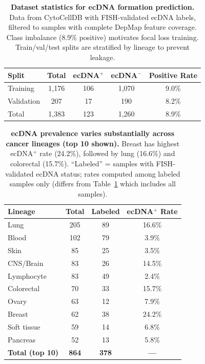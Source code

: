 \documentclass[sigconf,anonymous]{acmart}
\begin{document}
\begin{table}[h]
\caption{\textbf{Dataset statistics for ecDNA formation prediction.} Data from CytoCellDB with FISH-validated ecDNA labels, filtered to samples with complete DepMap feature coverage. Class imbalance (8.9\% positive) motivates focal loss training. Train/val/test splits are stratified by lineage to prevent leakage.}
\label{tab:dataset_stats}
\centering
\small
\begin{tabular}{@{}lcccc@{}}
\toprule
Split & Total & ecDNA$^+$ & ecDNA$^-$ & Positive Rate \\
\midrule
Training & 1,176 & 106 & 1,070 & 9.0\% \\
Validation & 207 & 17 & 190 & 8.2\% \\
\midrule
Total & 1,383 & 123 & 1,260 & 8.9\% \\
\bottomrule
\end{tabular}
\end{table}

\begin{table}[h]
\caption{\textbf{ecDNA prevalence varies substantially across cancer lineages (top 10 shown).} Breast has highest ecDNA$^+$ rate (24.2\%), followed by lung (16.6\%) and colorectal (15.7\%). ``Labeled'' = samples with FISH-validated ecDNA status; rates computed among labeled samples only (differs from Table~\ref{tab:dataset_stats} which includes all samples).}
\label{tab:lineage_prevalence}
\centering
\small
\begin{tabular}{@{}lccc@{}}
\toprule
Lineage & Total & Labeled & ecDNA$^+$ Rate \\
\midrule
Lung & 205 & 89 & 16.6\% \\
Blood & 102 & 79 & 3.9\% \\
Skin & 85 & 25 & 3.5\% \\
CNS/Brain & 83 & 26 & 14.5\% \\
Lymphocyte & 83 & 49 & 2.4\% \\
Colorectal & 70 & 33 & 15.7\% \\
Ovary & 63 & 12 & 7.9\% \\
Breast & 62 & 38 & 24.2\% \\
Soft tissue & 59 & 14 & 6.8\% \\
Pancreas & 52 & 13 & 5.8\% \\
\midrule
\textbf{Total (top 10)} & \textbf{864} & \textbf{378} & \textbf{---} \\
\bottomrule
\end{tabular}
\end{table}
\end{document}
